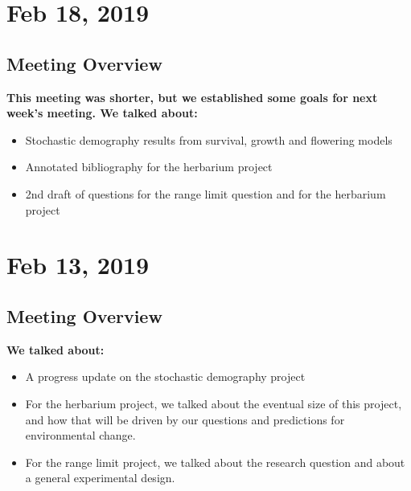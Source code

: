 \documentclass{article}
\begin{document}
\section*{Feb 18, 2019}
\subsection*{Meeting Overview}
\textbf{This meeting was shorter, but we established some goals for next week's meeting. We talked about:}
\begin{itemize}
\item{Stochastic demography results from survival, growth and flowering models}
\item{Annotated bibliography for the herbarium project}
\item{2nd draft of questions for the range limit question and for the herbarium project}
\end{itemize}

\section*{Feb 13, 2019}
\subsection*{Meeting Overview}
\textbf{We talked about:}
\begin{itemize}
\item{A progress update on the stochastic demography project}
\item{For the herbarium project, we talked about the eventual size of this project, and how that will be driven by our questions and predictions for environmental change.}
\item{For the range limit project, we talked about the research question and about a general experimental design.}
\end{itemize}
\end{document}
